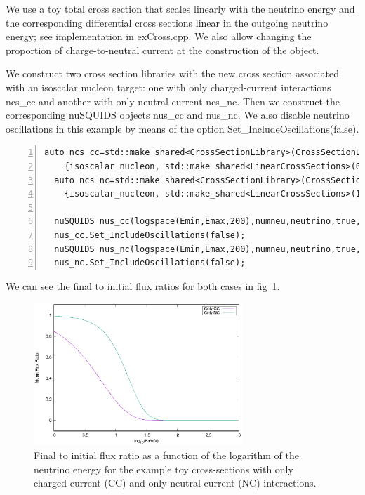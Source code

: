 \documentclass[3p,12pt]{elsarticle}
\newcommand{\ttf}{\ttfamily}
\begin{document}
We use a toy total cross section that scales linearly with
the neutrino energy and the corresponding differential cross sections
linear in the outgoing neutrino energy; see implementation in {\ttf
  exCross.cpp}. We also allow changing the proportion of charge-to-neutral
  current at the construction of the object.

We construct two cross section libraries with the new cross section
associated with an isoscalar nucleon target: one with only charged-current interactions
{\ttf ncs\_cc} and another with only neutral-current {\ttf
  ncs\_nc}. Then we construct the corresponding {\ttf nuSQUIDS} objects {\ttf nus\_cc} and {\ttf nus\_nc}.
We also disable neutrino oscillations in this example by means of the
option {\ttf Set\_IncludeOscillations(false)}.

\begin{lstlisting}[frame=leftline, numbers =  
    left,breaklines=true,label = ex:sin1]
  auto ncs_cc=std::make_shared<CrossSectionLibrary>(CrossSectionLibrary::MapType{
    {isoscalar_nucleon, std::make_shared<LinearCrossSections>(0.0)}});
  auto ncs_nc=std::make_shared<CrossSectionLibrary>(CrossSectionLibrary::MapType{
    {isoscalar_nucleon, std::make_shared<LinearCrossSections>(1.0)}});

  nuSQUIDS nus_cc(logspace(Emin,Emax,200),numneu,neutrino,true,ncs_cc);
  nus_cc.Set_IncludeOscillations(false);
  nuSQUIDS nus_nc(logspace(Emin,Emax,200),numneu,neutrino,true,ncs_nc);
  nus_nc.Set_IncludeOscillations(false);
\end{lstlisting}

We can see the final to initial flux ratios for both cases in fig~\ref{fig:crossext}.

\begin{figure}[h!]
  \label{fig:crossext}
  \centering
  \includegraphics[width=0.7\textwidth]{fig/crossext.eps} 
  \caption{Final to initial flux ratio as a function of the logarithm
    of the neutrino energy for the example toy cross-sections with
    only charged-current (CC) and only neutral-current (NC) interactions.} 
\end{figure}
\end{document}
